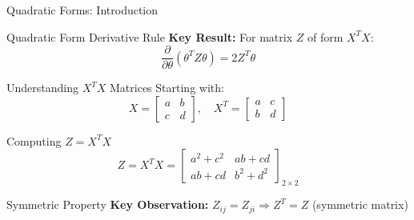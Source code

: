 \documentclass{beamer}
\begin{document}
\begin{frame}{Quadratic Forms: Introduction}
\begin{definitionbox}{Quadratic Form Derivative Rule}
\textbf{Key Result:} For matrix $Z$ of form $X^{T}X$:
$$\frac{\partial}{\partial \theta} (\theta^{T}Z\theta) = 2Z^T\theta$$
\end{definitionbox}

\begin{examplebox}{Understanding $X^TX$ Matrices}
Starting with:
$$X = \begin{bmatrix}
a & b \\
c & d
\end{bmatrix}, \quad X^{T} = \begin{bmatrix}
a & c \\
b & d
\end{bmatrix}$$
\end{examplebox}

\pause
\begin{keypointsbox}{Computing $Z = X^{T}X$}
$$Z = X^{T}X = \begin{bmatrix}
a^{2}+c^{2} & ab+cd \\
ab+cd & b^{2}+d^{2}
\end{bmatrix}_{2\times 2}$$
\end{keypointsbox}

\pause
\begin{alertbox}{Symmetric Property}
\textbf{Key Observation:} $Z_{ij} = Z_{ji} \Rightarrow Z^{T} = Z$ (symmetric matrix)
\end{alertbox}
\end{frame}
\end{document}

